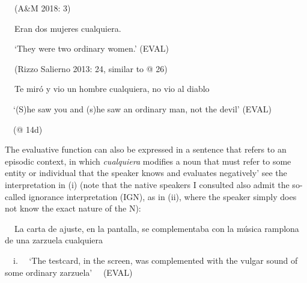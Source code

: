 \begin{styleStandard}
\textbf{\ \ }(A\&M 2018: 3)
\end{styleStandard}

\begin{styleStandard}
\textbf{\ \ }Eran dos mujeres cualquiera. 
\end{styleStandard}

\begin{styleStandard}
\textbf{\ \ }‘They were two ordinary women.’ (EVAL)
\end{styleStandard}

\begin{styleStandard}
\textbf{\ \ }(Rizzo Salierno 2013: 24, similar to @ 26)
\end{styleStandard}

\begin{styleStandard}
\label{bkm:Ref533953228}\textbf{\ \ }Te miró y vio un hombre cualquiera, no vio al diablo 
\end{styleStandard}

\begin{styleStandard}
\ \ ‘(S)he saw you and (s)he saw an ordinary man, not the devil’ (EVAL)
\end{styleStandard}

\begin{styleStandard}
\ \ (@ 14d)
\end{styleStandard}

\begin{styleStandard}
The evaluative function can also be expressed in a sentence that refers to an episodic context, in which \textit{cualquiera} modifies a noun that must refer to some entity or individual that the speaker knows and evaluates negatively’ see the interpretation in (i) (note that the native speakers I consulted also admit the so-called ignorance interpretation (IGN), as in (ii), where the speaker simply does not know the exact nature of the N):
\end{styleStandard}

\begin{styleStandard}
\label{bkm:Ref54686931}\textbf{\ \ }La carta de ajuste, en la pantalla, se complementaba con la música ramplona de una zarzuela cualquiera 
\end{styleStandard}

\begin{styleStandard}
\ \ i. \ \ ‘The testcard, in the screen, was complemented with the vulgar sound of some ordinary zarzuela’ \ \ (EVAL)
\end{styleStandard}

